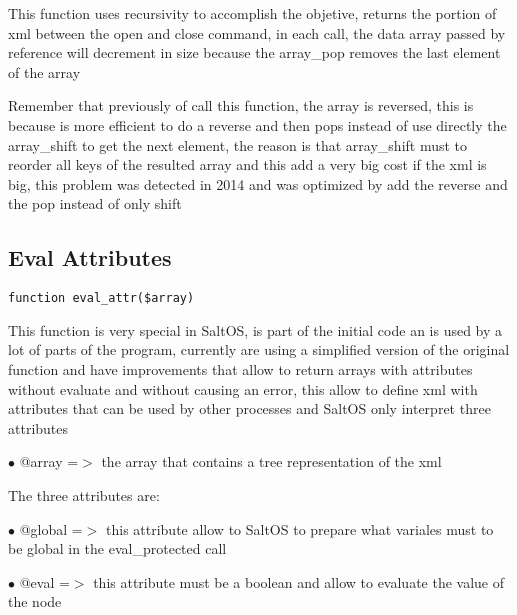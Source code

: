 \documentclass[a4paper]{book}
\begin{document}
This function uses recursivity to accomplish the objetive, returns the portion
of xml between the open and close command, in each call, the data array passed
by reference will decrement in size because the array\_pop removes the last element
of the array

Remember that previously of call this function, the array is reversed, this is
because is more efficient to do a reverse and then pops instead of use directly
the array\_shift to get the next element, the reason is that array\_shift must to
reorder all keys of the resulted array and this add a very big cost if the xml
is big, this problem was detected in 2014 and was optimized by add the reverse
and the pop instead of only shift

\hypertarget{toc302}{}
\subsection{Eval Attributes}

\begin{lstlisting}
function eval_attr($array)
\end{lstlisting}

This function is very special in SaltOS, is part of the initial code an
is used by a lot of parts of the program, currently are using a simplified
version of the original function and have improvements that allow to return
arrays with attributes without evaluate and without causing an error, this
allow to define xml with attributes that can be used by other processes and
SaltOS only interpret three attributes

\begin{compactitem}
\item[\color{myblue}$\bullet$] @array =$>$ the array that contains a tree representation of the xml
\end{compactitem}

The three attributes are:

\begin{compactitem}
\item[\color{myblue}$\bullet$] @global =$>$ this attribute allow to SaltOS to prepare what variales must to
be global in the eval\_protected call
\end{compactitem}

\begin{compactitem}
\item[\color{myblue}$\bullet$] @eval =$>$ this attribute must be a boolean and allow to evaluate the value
of the node
\end{compactitem}
\end{document}
